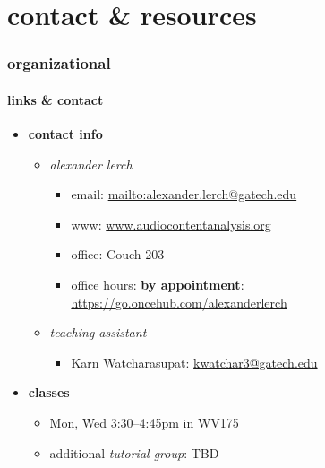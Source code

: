 

\subtitle{Part 1: Organizational}


	

    \section[contact]{contact \& resources}
        \begin{frame}\frametitle{organizational}\framesubtitle{links \& contact}
            \begin{itemize}
                \item \textbf{contact info}
                    \begin{itemize}
                        \item   \textit{alexander lerch}
                            \begin{itemize}
                                \item   {email}: \url{mailto:alexander.lerch@gatech.edu}
                                \item   {www}: \url{www.audiocontentanalysis.org}
                                \item   {office}: Couch 203
                                \item   {office hours}:  \textbf{by appointment}: \url{https://go.oncehub.com/alexanderlerch}
                            \end{itemize}
                        \item   \textit{teaching assistant}
                            \begin{itemize}
                                \item    Karn Watcharasupat: \url{kwatchar3@gatech.edu}
                            \end{itemize}
                    \end{itemize}
                
                \smallskip
                \item<2-> \textbf{classes}
                    \begin{itemize}
                        \item   Mon, Wed  3:30--4:45pm in WV175
                        \item   additional \textit{tutorial group}: TBD
                    \end{itemize}
                

\end{itemize}
\end{frame}
